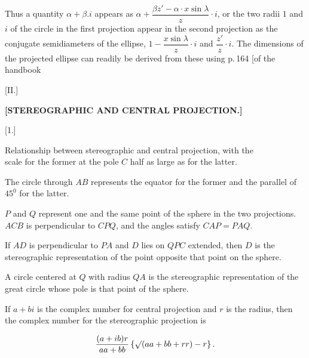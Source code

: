
Thus a quantity $\alpha+\beta.i$ appears as $\alpha+\dfrac{\beta z' - \alpha\cdot x\sin\lambda}{z}\cdot i$, or the two radii $1$ and $i$ of the circle in the first projection appear in the second projection as the conjugate semidiameters of the ellipse, $1-\dfrac{x\sin\lambda}{z}\cdot i$ and $\dfrac{z'}{z}\cdot i$. The dimensions of the projected ellipse can readily be derived from these using p.\,164 [of the handbook



\begin{center}
[II.]
\end{center}

\begin{center}
\bfseries [STEREOGRAPHIC AND CENTRAL PROJECTION.]
\end{center}

\begin{center}
[1.]
\end{center}

\begin{center}
Relationship between stereographic and central projection, with the\\
scale for the former at the pole $C$ half as large as for the latter.
\end{center}

The circle through $AB$ represents the equator for the former and the parallel of $45^0$ for the latter.

\begin{center}\end{center}
\indent $P$ and $Q$ represent one and the same point of the sphere in the two projections. $ACB$ is perpendicular to $CPQ$, and the angles satisfy $CAP = PAQ$.

If $AD$ is perpendicular to $PA$ and $D$ lies on $QPC$ extended, then $D$ is the stereographic representation of the point opposite that point on the sphere.

A circle centered at $Q$ with radius $QA$ is the stereographic representation of the great circle whose pole is that point of the sphere.

If $a+bi$ is the complex number for central projection and $r$ is the radius, then the complex number for the stereographic projection is

\[
\frac{(a+ib)r}{aa+bb}\left\{\mathord{\surd}(aa+bb+rr)-r\right\}.
\]


